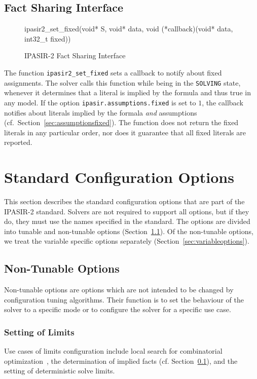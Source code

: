 \documentclass[sat]{iosart2x}
\begin{document}
\subsection{Fact Sharing Interface}\label{sec:factsharing}

\begin{figure}[t]
\tt\raggedright
ipasir2\_set\_fixed(void* S, void* data, void (*callback)(void* data, int32\_t fixed))
\caption{IPASIR-2 Fact Sharing Interface}
\end{figure}

The function \texttt{ipasir2\_set\_fixed} sets a callback to notify about fixed assignments.
The solver calls this function while being in the \texttt{SOLVING} state, whenever it determines that a literal is implied by the formula and thus true in any model.
If the option \texttt{ipasir.assumptions.fixed} is set to $1$, the callback notifies about literals implied by the formala \emph{and} assumptions (cf.~Section~\ref{sec:assumptionsfixed}).
The function does not return the fixed literals in any particular order, nor does it guarantee that all fixed literals are reported.



\section{Standard Configuration Options}

This section describes the standard configuration options that are part of the IPASIR-2 standard.
Solvers are not required to support all options, but if they do, they must use the names specified in the standard.
The options are divided into tunable and non-tunable options (Section~\ref{sec:nontunable}).
Of the non-tunable options, we treat the variable specific options separately (Section~\ref{sec:variableoptions}).

\subsection{Non-Tunable Options}\label{sec:nontunable}

Non-tunable options are options which are not intended to be changed by configuration tuning algorithms.
Their function is to set the behaviour of the solver to a specific mode or to configure the solver for a specific use case.

\subsubsection{Setting of Limits}
Use cases of limits configuration include local search for combinatorial optimization~\cite{Cohen:2021:LSOpt}, the determination of implied facts (cf. Section~\ref{sec:factsharing}), and the setting of deterministic solve limits.
\end{document}
